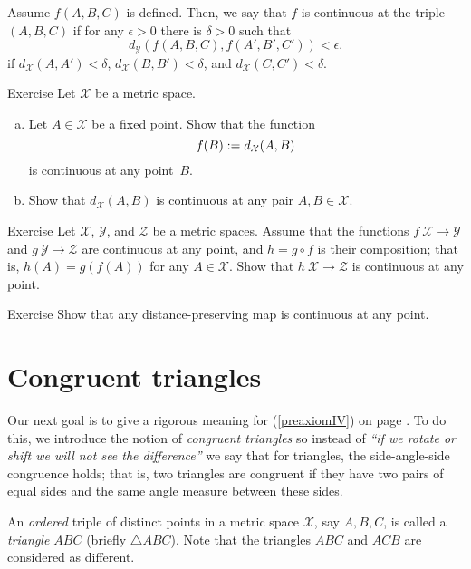 Assume $f(A,B,C)$ is defined.
Then, we say that $f$ is continuous at the triple $(A,B,C)$ 
if for any $\epsilon>0$ there is $\delta>0$ such that 
\[d_{\mathcal Y}(f(A,B,C),f(A',B',C'))<\epsilon.\]
if $d_{\mathcal X}(A,A')<\delta$, $d_{\mathcal X}(B,B')<\delta$, and $d_{\mathcal X}(C,C')<\delta$.


\begin{thm}{Exercise}\label{ex:dist-cont}
Let $\mathcal{X}$ be a metric space.
\begin{enumerate}[(a)]
\item\label{ex:dist-cont:a} Let $A\in \mathcal{X}$ be a fixed point.
Show that the function 
$$f(B):=
d_{\mathcal{X}}(A,B)$$ 
is continuous at any point~$B$.
\item Show that $d_{\mathcal{X}}(A,B)$ is continuous at any pair $A,B\in \mathcal{X}$.
\end{enumerate}

\end{thm}

\begin{thm}{Exercise}\label{ex:comp+cont}
Let $\mathcal{X}$, $\mathcal{Y}$, and $\mathcal{Z}$ be a metric spaces.
Assume that the functions $f\:\mathcal{X}\to\mathcal{Y}$
and $g\:\mathcal{Y}\to\mathcal{Z}$ are continuous at any point,
and $h=g\circ f$ is their composition;
that is, $h(A)=g(f(A))$ for any $A\in \mathcal{X}$.
Show that $h\:\mathcal{X}\to\mathcal{Z}$ is continuous at any point.
\end{thm}

\begin{thm}{Exercise}\label{ex:isom-cont}
Show that any distance-preserving map is continuous at any point.
\end{thm}




\section*{Congruent triangles} 

Our next goal is to give a rigorous meaning for (\ref{preaxiomIV}) on page \pageref{preaxiomIV}.
To do this, we introduce the notion of {}\emph{congruent triangles}
so instead of {}\emph{``if we rotate or shift we will not see the difference''} we say that for triangles, the side-angle-side congruence holds;
that is, two triangles are congruent if they have two pairs of equal sides and the same angle measure between these sides.

An {}\emph{ordered} triple of distinct points in a metric space $\mathcal{X}$, 
say $A,B,C$,
is called a \emph{triangle $ABC$}\label{page:def:triangle} (briefly $\triangle A B C$).
Note that the triangles $A B C$ and $A C B$ are considered as different.


